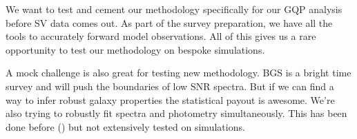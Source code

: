 We want to test and cement our methodology specifically for our GQP 
analysis before SV data comes out. 
As part of the survey preparation, we have all the tools to accurately 
forward model observations. 
All of this gives us a rare opportunity to test our methodology on bespoke
simulations. 

A mock challenge is also great for testing new methodology.
BGS is a bright time survey and will push the boundaries of low SNR 
spectra. But if we can find a way to  infer robust galaxy properties the 
statistical payout is awesome.  
We're also trying to robustly fit spectra and photometry simultaneously. 
This has been done before () but not extensively tested 
on simulations. 


